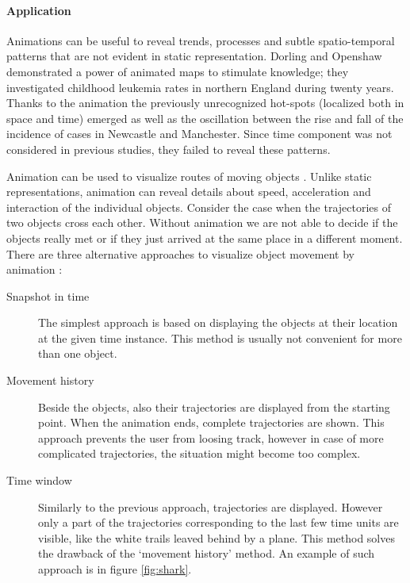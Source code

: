 \documentclass[a4paper,12pt,oneside]{book}
\begin{document}
\paragraph{Application}
Animations can be useful to reveal trends, processes and subtle spatio-temporal patterns
that are not evident in static representation. Dorling and Openshaw \cite{dorling1993using}
demonstrated a power of animated maps to stimulate knowledge;
they investigated childhood leukemia rates in northern England during twenty years.
Thanks to the animation the previously unrecognized hot-spots (localized both in space and time) emerged
as well as the oscillation between the rise and fall of the incidence of
cases in Newcastle and Manchester. Since time component was not considered in previous studies,
they failed to reveal these patterns.

Animation can be used to visualize routes of moving objects \cite{andrienko2003exploratory}.
Unlike static representations, animation can reveal details about speed, acceleration and interaction
of the individual objects. Consider the case when the trajectories of two objects cross each other.
Without animation we are not able to decide if the objects really met or
if they just arrived at the same place in a different moment.
There are three alternative approaches to visualize object movement by animation \cite{andrienko2003exploratory}:
    \begin{description}
        \item[Snapshot in time] The simplest approach is based on displaying the objects
        at their location at the given time instance. This method is usually not convenient for more than one object.
        \item[Movement history] Beside the objects, also their trajectories are displayed from the starting point.
        When the animation ends, complete trajectories are shown. This approach prevents the user from loosing track,
        however in case of more complicated trajectories, the situation might become too complex.
        \item[Time window] Similarly to the previous approach, trajectories are displayed.
        However only a part of the trajectories corresponding to the last few time units are visible,
        like the white trails leaved behind by a plane.
        This method solves the drawback of the `movement history' method.
        An example of such approach is in figure \ref{fig:shark}.
    \end{description}
\end{document}
